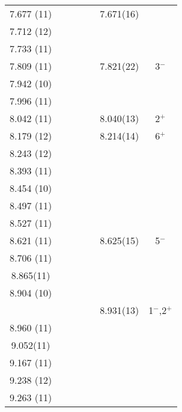\begin{center}
\begin{longtable}{cc c cc cc}
  7.677 (11)    &       &       &       &       &    7.671(16)      &                           \\
  7.712 (12)    &       &       &       &       &       &       \\
  7.733 (11)    &       &       &       &       &       &       \\
  7.809 (11)    &       &       &       &       &    7.821(22)      &          3$^-$            \\
  7.942 (10)    &       &       &       &       &       &       \\
  7.996 (11)    &       &       &       &       &       &       \\
  8.042 (11)    &       &       &       &       &    8.040(13)      &          2$^+$            \\
  8.179 (12)    &       &       &       &       &    8.214(14)      &          6$^+$            \\
  8.243 (12)    &       &       &       &       &       &       \\
  8.393 (11)    &       &       &       &       &       &       \\
  8.454 (10)    &       &       &       &       &       &       \\
  8.497 (11)    &       &       &       &       &       &       \\
  8.527 (11)    &       &       &       &       &       &       \\
  8.621 (11)    &       &       &       &       &    8.625(15)      &          5$^-$            \\
  8.706 (11)    &       &       &       &       &       &       \\
   8.865(11)    &       &       &       &       &       &       \\
  8.904 (10)    &       &       &       &       &       &       \\
    &       &       &       &       &    8.931(13)      &          1$^-$,2$^+$      \\
  8.960 (11)    &       &       &       &       &       &       \\
   9.052(11)    &       &       &       &       &       &       \\
  9.167 (11)    &       &       &       &       &       &       \\
  9.238 (12)    &       &       &       &       &       &       \\
  9.263 (11)    &       &       &       &       &       &       \\

\end{longtable}
\end{center}
